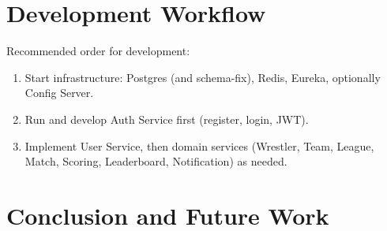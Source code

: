 \documentclass[11pt,a4paper]{article}
\begin{document}
\section{Development Workflow}
Recommended order for development:
\begin{enumerate}
\item Start infrastructure: Postgres (and schema-fix), Redis, Eureka, optionally Config Server.
\item Run and develop Auth Service first (register, login, JWT).
\item Implement User Service, then domain services (Wrestler, Team, League, Match, Scoring, Leaderboard, Notification) as needed.
\end{enumerate}

\section{Conclusion and Future Work}
\end{document}
